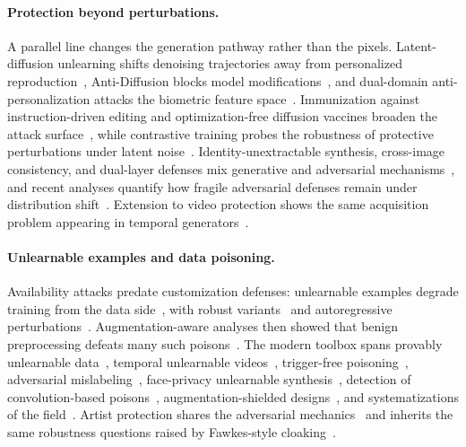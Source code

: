\paragraph{Protection beyond perturbations.}
A parallel line changes the generation pathway rather than the pixels.
Latent-diffusion unlearning shifts denoising trajectories away from
personalized reproduction~\cite{devulapally2025latent}, Anti-Diffusion blocks
model modifications~\cite{li2025antidiffusion}, and dual-domain
anti-personalization attacks the biometric feature
space~\cite{yang2024ddap}. Immunization against instruction-driven editing and
optimization-free diffusion vaccines broaden the
attack surface~\cite{trippodo2025immunizing,ozden2024diffvax}, while
contrastive training probes the robustness of protective perturbations under
latent noise~\cite{peng2025contrastive}. Identity-unextractable synthesis,
cross-image consistency, and dual-layer defenses mix generative and
adversarial mechanisms~\cite{wang2025make,wang2025privacy,jia2025dladiff}, and
recent analyses quantify how fragile adversarial defenses remain under
distribution shift~\cite{chen2025fragile}. Extension to video protection
shows the same acquisition problem appearing in temporal
generators~\cite{huang2026delving,he2026chronolock}.

\paragraph{Unlearnable examples and data poisoning.}
Availability attacks predate customization defenses: unlearnable examples
degrade training from the data side~\cite{huang2021unlearnable}, with robust
variants~\cite{fu2022robust} and autoregressive
perturbations~\cite{sandovalsegura2022autoregressive}. Augmentation-aware
analyses then showed that benign preprocessing defeats many such
poisons~\cite{qin2023learning,jiang2023false}. The modern toolbox spans
provably unlearnable data~\cite{wang2025provably}, temporal unlearnable
videos~\cite{wu2025temporal}, trigger-free poisoning~\cite{jang2025silent},
adversarial mislabeling~\cite{wu2025feasibility}, face-privacy unlearnable
synthesis~\cite{wu2025myopia}, detection of convolution-based
poisons~\cite{li2025detecting}, augmentation-shielded
designs~\cite{gong2026armor}, and systematizations of the
field~\cite{zhang2026unlearnability,li2025survey}. Artist protection shares
the adversarial mechanics~\cite{shan2023glaze} and inherits the same
robustness questions raised by Fawkes-style cloaking~\cite{shan2020fawkes}.

